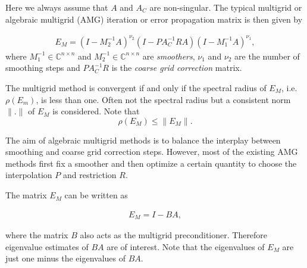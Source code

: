 \documentclass[final]{siamltex}
\newcommand{\innCnn}{\in\mathbb{C}^{n\times n}}
\newcommand{\beqo}{\begin{eqnarray*}}
\newcommand{\beq}{\begin{eqnarray}}
\newcommand{\eeqo}{\end{eqnarray*}}
\newcommand{\eeq}{\end{eqnarray}}
\numberwithin{equation}{section}
\begin{document}
Here we always assume  that $A$ and $A_C$ are  non-singular. 
The typical multigrid or algebraic multigrid (AMG) iteration or error propagation matrix  is then given by 

 \beq \label{mgiteration}
E_M = (I-M_2^{-1}A)^{\nu_2}(I -  PA_C^{-1}RA)(I-M_1^{-1}A)^{\nu_1},
\eeq
where $M_1^{-1} \innCnn$ and $M_2^{-1} \innCnn$  are   {\it smoothers}, $\nu_1$
and $\nu_2$  are the number of  smoothing steps and $PA_C^{-1}R$ is the {\it coarse grid
correction} matrix. 

The multigrid method is convergent if and only if the spectral radius of $E_M$, i.e. $\rho(E_m)$, is less than one. 
Often not the spectral radius but a consistent norm $\|.\|$ of $E_M$ is considered. Note that 
\[
\rho(E_M) \leq \|E_M\|.
\]  

The aim of algebraic multigrid methods is to balance the interplay between  smoothing and coarse grid correction steps. However, most of the existing AMG methods  first fix a smoother and then optimize a certain quantity to choose  the interpolation $P$ and restriction $R$.


%

The matrix $E_M$ can be written  as 

 \beq \label{mgb}
E_M = I-BA,
\eeq



where the    matrix $B$  also acts as the multigrid preconditioner. Therefore
eigenvalue estimates of $BA$ are of interest. Note that  the eigenvalues of $E_M$
are just one  minus the eigenvalues of $BA$.




\end{document}
